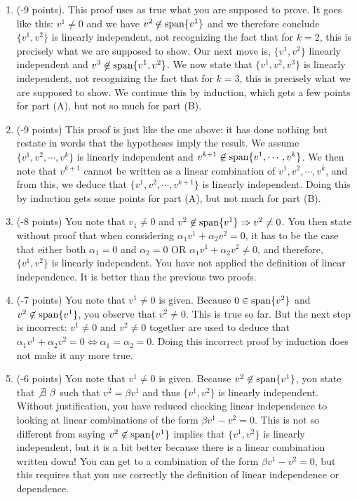 \documentclass[letterpaper]{article}
\begin{document}
\begin{itemize}
\begin{enumerate}
\item (-9 points). This proof uses as true what you are supposed to prove. It goes like this: $v^1\not = 0$ and we have $v^2\not \in \textrm{span} \{ v^1 \}$ and we therefore conclude $\{v^1, v^{2}\}$ is linearly independent, not recognizing the fact that for $k=2$, this is precisely what we are supposed to show. Our next move is, $\{v^1, v^{2}\}$ linearly independent and $v^3\not \in \textrm{span} \{ v^1, v^2 \}$. We now state that $\{v^1, v^{2}, v^3\}$ is linearly independent, not recognizing the fact that for $k=3$, this is precisely what we are supposed to show. We continue this by induction, which gets a few points for part (A), but not so much for part (B).

\item (-9 points)  This proof is just like the one above: it has done nothing but restate in words that the hypotheses imply the result. We assume $\{v^1, v^2, \cdots, v^{k}\}$ is linearly independent and $v^{k+1}\not \in \textrm{span} \{ v^1, \cdots, v^{k} \}$. We then note that $v^{k+1}$ cannot be written as a linear combination of $v^1, v^2, \cdots, v^{k}$, and from this, we deduce that $\{v^1, v^2, \cdots, v^{k+1}\}$ is linearly independent. Doing this by induction gets some points for part (A), but not much for part (B).

    \item (-8 points) You note that $v_1\not = 0$ and $v^2\not\in \textrm{span} \{ v^1 \}\Rightarrow v^2\not = 0$. You then state without proof that when considering
    $\alpha_1 v^1 + \alpha_2 v^2 = 0$, it has to be the case that either both $\alpha_1=0$ and $\alpha_2=0$ OR $\alpha_1 v^1 + \alpha_2 v^2 \not = 0$, and therefore, $\{v^1, v^2\}$ is linearly independent. You have not applied the definition of linear independence. It is better than the previous two proofs.



\item (-7 points) You note that $v^1\not = 0$ is given. Because $0\in \textrm{span} \{ v^2 \}$ and $v^2\not \in \textrm{span} \{ v^1 \}$, you observe that $v^2\not = 0$. This is true so far. But the next step is incorrect: $v^1\not = 0$ and $v^2\not = 0$ together are used to deduce that $\alpha_1 v^1 + \alpha_2 v^2=0 \Leftrightarrow \alpha_1 = \alpha_2 = 0$. Doing this incorrect proof by induction does not make it any more true.

\item   (-6 points) You note that $v^1\not = 0$ is given. Because $v^2 \not \in \textrm{span} \{ v^1 \}$, you state that $\not \exists ~\beta$  such that $v^2 = \beta v^1 $ and thus $\{v^1, v^2\}$ is linearly  independent. Without justification, you have reduced checking linear independence to looking at linear combinations of the form $\beta v^1 - v^2=0$. This is not so different from saying $v^2 \not \in \textrm{span} \{ v^1 \}$ implies that $\{v^1, v^2\}$ is linearly  independent, but it is a bit better because there is a linear combination written down! You can get to a combination of the form $\beta v^1 - v^2=0$, but this requires that you use correctly the definition of linear independence or dependence.


\end{enumerate}
\end{itemize}
\end{document}
